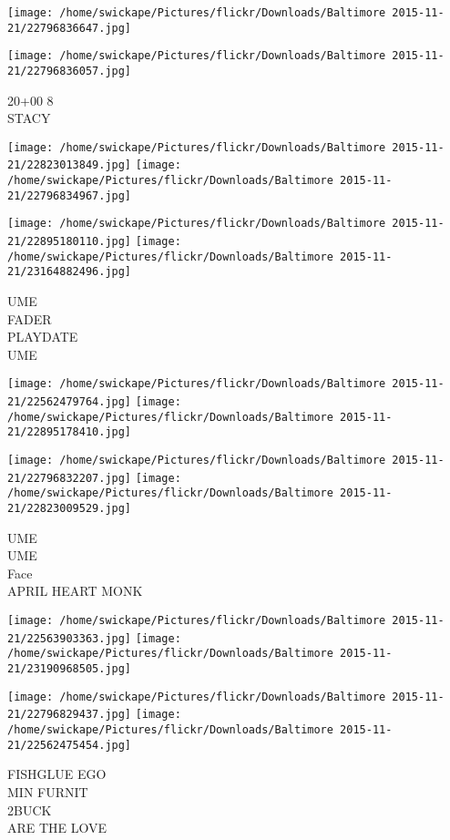 \documentclass[10pt,letterpaper]{article}
\begin{document}
\texttt{[image: /home/swickape/Pictures/flickr/Downloads/Baltimore 2015-11-21/22796836647.jpg]}

\vspace{0.25in}
\texttt{[image: /home/swickape/Pictures/flickr/Downloads/Baltimore 2015-11-21/22796836057.jpg]}

20+00 8\\
STACY
\pagebreak

\texttt{[image: /home/swickape/Pictures/flickr/Downloads/Baltimore 2015-11-21/22823013849.jpg]}
\texttt{[image: /home/swickape/Pictures/flickr/Downloads/Baltimore 2015-11-21/22796834967.jpg]}

\texttt{[image: /home/swickape/Pictures/flickr/Downloads/Baltimore 2015-11-21/22895180110.jpg]}
\texttt{[image: /home/swickape/Pictures/flickr/Downloads/Baltimore 2015-11-21/23164882496.jpg]}

UME\\
FADER\\
PLAYDATE\\
UME
\pagebreak

\texttt{[image: /home/swickape/Pictures/flickr/Downloads/Baltimore 2015-11-21/22562479764.jpg]}
\texttt{[image: /home/swickape/Pictures/flickr/Downloads/Baltimore 2015-11-21/22895178410.jpg]}

\texttt{[image: /home/swickape/Pictures/flickr/Downloads/Baltimore 2015-11-21/22796832207.jpg]}
\texttt{[image: /home/swickape/Pictures/flickr/Downloads/Baltimore 2015-11-21/22823009529.jpg]}

UME\\
UME\\
Face\\
APRIL HEART MONK
\pagebreak

\texttt{[image: /home/swickape/Pictures/flickr/Downloads/Baltimore 2015-11-21/22563903363.jpg]}
\texttt{[image: /home/swickape/Pictures/flickr/Downloads/Baltimore 2015-11-21/23190968505.jpg]}

\texttt{[image: /home/swickape/Pictures/flickr/Downloads/Baltimore 2015-11-21/22796829437.jpg]}
\texttt{[image: /home/swickape/Pictures/flickr/Downloads/Baltimore 2015-11-21/22562475454.jpg]}

FISHGLUE EGO\\
MIN FURNIT\\
2BUCK\\
ARE THE LOVE
\pagebreak
\end{document}
